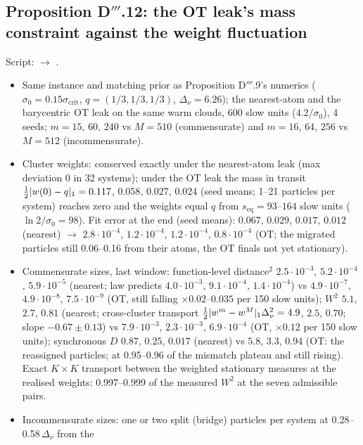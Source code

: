 \subsection{Proposition D\texorpdfstring{$'''$}{'''}.12: the OT leak's mass constraint against the weight fluctuation}

Script:  $\to$ .
\begin{itemize}
  \item Same instance and matching prior as Proposition D$'''$.9's numerics ($\sigma_0=0.15\sigma_{\mathrm{crit}}$,
    $q=(1/3,1/3,1/3)$, $\Delta_\nu=6.26$); the nearest-atom and the barycentric OT leak on the same warm clouds, 600
    slow units ($4.2/\sigma_0$), 4 seeds; $m=15$, $60$, $240$ vs $M=510$ (commensurate) and $m=16$, $64$, $256$ vs
    $M=512$ (incommensurate).
  \item Cluster weights: conserved exactly under the nearest-atom leak (max deviation 0 in 32 systems); under the OT
    leak the mass in transit $\frac12\lvert w(0)-q\rvert_1=0.117$, $0.058$, $0.027$, $0.024$ (seed means; 1--21 particles
    per system) reaches zero and the weights equal $q$ from $s_{\mathrm{eq}}=93$--$164$ slow units
    ($\ln2/\sigma_0=98$). Fit error at the end (seed means): $0.067$, $0.029$, $0.017$, $0.012$ (nearest) $\to$
    $2.8\cdot10^{-4}$, $1.2\cdot10^{-4}$, $1.2\cdot10^{-4}$, $0.8\cdot10^{-4}$ (OT; the migrated particles still
    0.06--0.16 from their atoms, the OT finals not yet stationary).
  \item Commensurate sizes, last window: function-level distance$^2$ $2.5\cdot10^{-3}$, $5.2\cdot10^{-4}$,
    $5.9\cdot10^{-5}$ (nearest; law predicts $4.0\cdot10^{-3}$, $9.1\cdot10^{-4}$, $1.4\cdot10^{-4}$) vs
    $4.9\cdot10^{-7}$, $4.9\cdot10^{-8}$, $7.5\cdot10^{-9}$ (OT, still falling $\times0.02$--$0.035$ per 150 slow
    units); $W^2$ $5.1$, $2.7$, $0.81$ (nearest; cross-cluster transport
    $\frac12\lvert w^m-w^M\rvert_1\Delta_\nu^2=4.9$, $2.5$, $0.70$; slope $-0.67\pm0.13$) vs $7.9\cdot10^{-3}$,
    $2.3\cdot10^{-3}$, $6.9\cdot10^{-4}$ (OT, $\times0.12$ per 150 slow units); synchronous $D$ $0.87$, $0.25$,
    $0.017$ (nearest) vs $5.8$, $3.3$, $0.94$ (OT: the reassigned particles; at 0.95--0.96 of the mismatch plateau
    and still rising). Exact $K\times K$ transport between the weighted stationary measures at the realised weights:
    0.997--0.999 of the measured $W^2$ at the seven admissible pairs.
  \item Incommensurate sizes: one or two split (bridge) particles per system at 0.28--0.58\,$\Delta_\nu$ from the

\end{itemize}
